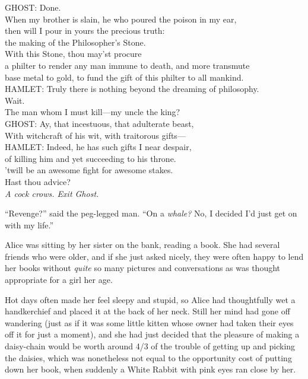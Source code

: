 \begin{playdialog}
GHOST: Done.\\
When my brother is slain, he who poured the poison in my ear,\\
then will I pour in yours the precious truth:\\
the making of the Philosopher’s Stone.\\
With this Stone, thou may’st procure\\
a philter to render any man immune to death, and more transmute\\ base metal to gold, to fund the gift of this philter to all mankind.\\

HAMLET: Truly there is nothing beyond the dreaming of philosophy.\\ Wait.\\ The man whom I must kill—my uncle the king?\\

GHOST: Ay, that incestuous, that adulterate beast,\\
With witchcraft of his wit, with traitorous gifts—\\

HAMLET: Indeed, he has such gifts I near despair,\\
of killing him and yet succeeding to his throne.\\
’twill be an awesome fight for awesome stakes.\\
Hast thou advice?\\

\emph{A cock crows. Exit Ghost.}
\end{playdialog}


“Revenge?” said the peg-legged man. “On a \emph{whale?} No, I decided I’d just get on with my life.”


Alice was sitting by her sister on the bank, reading a book. She had several friends who were older, and if she just asked nicely, they were often happy to lend her books without \emph{quite} so many pictures and conversations as was thought appropriate for a girl her age.

Hot days often made her feel sleepy and stupid, so Alice had thoughtfully wet a handkerchief and placed it at the back of her neck. Still her mind had gone off wandering (just as if it was some little kitten whose owner had taken their eyes off it for just a moment), and she had just decided that the pleasure of making a daisy-chain would be worth around 4/3 of the trouble of getting up and picking the daisies, which was nonetheless not equal to the opportunity cost of putting down her book, when suddenly a White Rabbit with pink eyes ran close by her.

